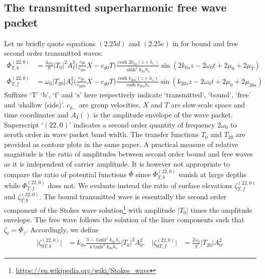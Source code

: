 \documentclass[internal]{sintefmemo}
\begin{document}
\subsection{The transmitted superharmonic free wave packet}
Let us briefly quote equations $(2.25d)$ and $(2.25e)$ in \citet{li_2021_step1} for bound and free second order transmitted waves:
\begin{subequations}
\begin{align}
\Phi_{T,b}^{(22,0)} &= \frac{3\omega_0}{8} |T_0|^2A_I^2\bigg(\frac{c_{g0}}{c_{g0s}}X -c_{g0}T\bigg)
\frac{\cosh 2 k_{0s}(z+h_s)}{\sinh^4k_{0s}h_s} \sin(2k_{0s}z - 2\omega_0 t +2\mu_0+2\mu_T)
\\
\Phi_{T,f}^{(22,0)} &= \omega_0 |T_{20}|A_I^2\bigg(\frac{c_{g0}}{c_{g20s}}X -c_{g0}T\bigg)
\frac{\cosh k_{20s}(z+h_s)}{\cosh k_{20s}h_s} \sin(k_{20s}z - 2\omega_0 t +2\mu_0+2\mu_{20s})
\end{align}%
\label{eq:Phi}%
\end{subequations}%
Suffixes `T' `b', `f' and `s' here respectively indicate `transmitted', `bound', `free' and `shallow (side)'. $c_{g\dots}$ are group velocities, $X$ and $T$ are slow-scale space and time coordinates and $A_I()$ is the amplitude envelope of the wave packet. Superscript `$(22,0)$' indicates a second order quantity of frequency $2\omega_0$ to zeroth order in wave packet band width.
The transfer functions $T_0$ and $T_{20}$ are provided as contour plots in the same paper.
A practical measure of relative magnitude is the ratio of amplitudes between second order bound and free waves as it is independent of carrier amplitude. 
It is however not appropriate to compare the ratio of potential functions $\Phi$ since $\Phi_{T,b}^{(22,0)}$ vanish at large depths while $\Phi_{T,f}^{(22,0)}$ does not. 
We evaluate instead the ratio of surface elevations $\zeta_{T,f}^{(22,0)}$ and $\zeta_{T,b}^{(22,0)}$. %
The bound transmitted wave is essentially the second order component of the Stokes wave solution\footnote{\url{https://en.wikipedia.org/wiki/Stokes_wave}} with amplitude $|T_0|$ times the amplitude envelope. 
The free wave follows the solution of the liner components such that $\zeta_t = \Phi_z$. Accordingly, we define
\begin{align}
\big|\zeta_{0T,b}^{(22,0)}\big| &= k_{0s}\frac{3-\tanh^2k_{0s}h_s}{4\tanh^3k_{0s}h_s} |T_0|^2 A_0^2 ,
&
\big|\zeta_{0T,f}^{(22,0)}\big| &= \frac{2\omega_0}{g}|T_{20}| A_0^2.
\end{align}%
\end{document}
